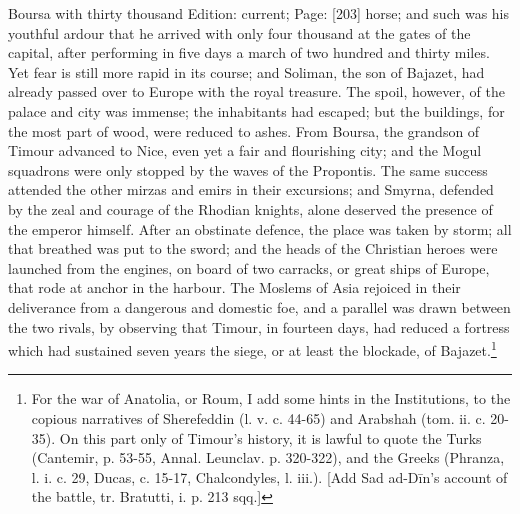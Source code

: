Boursa with thirty thousand Edition: current; Page: [203] horse; and such was his youthful ardour that he arrived with only four thousand at the gates of the capital, after performing in five days a march of two hundred and thirty miles. Yet fear is still more rapid in its course; and Soliman, the son of Bajazet, had already passed over to Europe with the royal treasure. The spoil, however, of the palace and city was immense; the inhabitants had escaped; but the buildings, for the most part of wood, were reduced to ashes. From Boursa, the grandson of Timour advanced to Nice, even yet a fair and flourishing city; and the Mogul squadrons were only stopped by the waves of the Propontis. The same success attended the other mirzas and emirs in their excursions; and Smyrna, defended by the zeal and courage of the Rhodian knights, alone deserved the presence of the emperor himself. After an obstinate defence, the place was taken by storm; all that breathed was put to the sword; and the heads of the Christian heroes were launched from the engines, on board of two carracks, or great ships of Europe, that rode at anchor in the harbour. The Moslems of Asia rejoiced in their deliverance from a dangerous and domestic foe, and a parallel was drawn between the two rivals, by observing that Timour, in fourteen days, had reduced a fortress which had sustained seven years the siege, or at least the blockade, of Bajazet.\footnote{For the war of Anatolia, or Roum, I add some hints in the Institutions, to the copious narratives of Sherefeddin (l. v. c. 44-65) and Arabshah (tom. ii. c. 20-35). On this part only of Timour\texthebrew{}’s history, it is lawful to quote the Turks (Cantemir, p. 53-55, Annal. Leunclav. p. 320-322), and the Greeks (Phranza, l. i. c. 29, Ducas, c. 15-17, Chalcondyles, l. iii.). [Add Sad ad-Dīn\texthebrew{}’s account of the battle, tr. Bratutti, i. p. 213 sqq.]}

